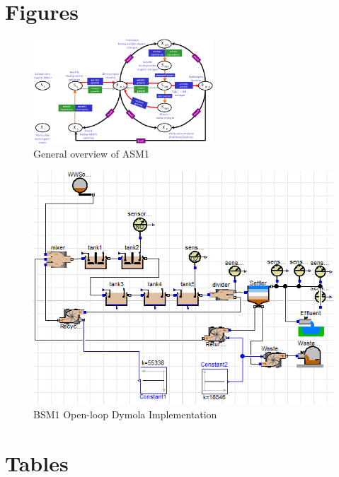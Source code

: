 \section{Figures}
\begin{figure}[htp]
    \centering
    \includegraphics[width=0.6\textwidth]{Report/Figures/asm1-overview.pdf}
    \caption{General overview of ASM1}
    \label{fig:ASM1-overview}
\end{figure}

\newpage

\begin{figure}
    \centering
    \includegraphics{Report/Figures/task1c.png}
    \caption{BSM1 Open-loop Dymola Implementation}
    \label{fig:openloop}
\end{figure}
\section{Tables}
\newpage